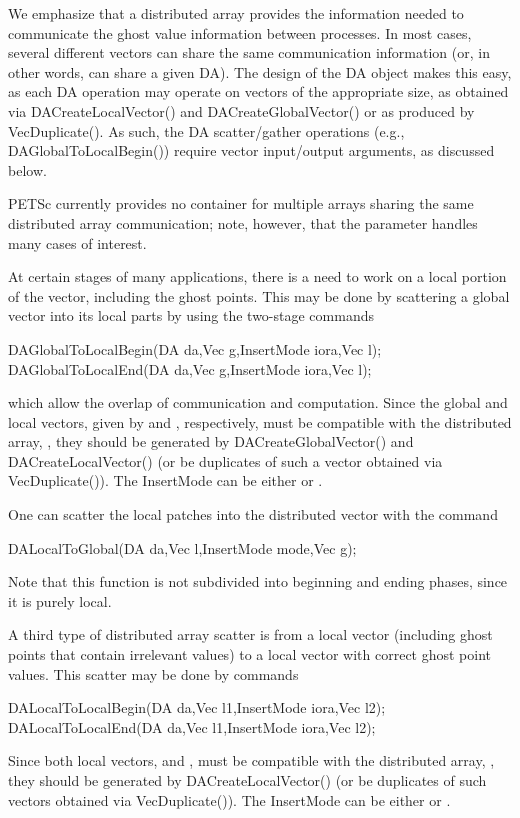 We emphasize that a distributed array provides the information needed
to communicate the ghost value information between processes.  In most
cases, several different vectors can share the same communication
information (or, in other words, can share a given DA).  The
design of the DA object makes this easy, as each DA
operation may operate on vectors of the appropriate size, as obtained
via DACreateLocalVector() and DACreateGlobalVector() or as
produced by VecDuplicate().  As such, the DA
scatter/gather operations (e.g., DAGlobalToLocalBegin()) require
vector input/output arguments, as discussed below.

PETSc currently provides no container for multiple arrays sharing the
same distributed array communication; note, however, that the 
parameter handles many cases of interest.

At certain stages of many applications, there is a need to work 
on a local portion of the vector, including the ghost points. 
This may be done by scattering a global vector into its 
local parts by using the two-stage commands
\begin{tabbing}
  DAGlobalToLocalBegin(DA da,Vec g,InsertMode iora,Vec l);\\
  DAGlobalToLocalEnd(DA da,Vec g,InsertMode iora,Vec l);
\end{tabbing}
which allow the overlap of communication and computation.
  
Since the global and local vectors, given by  and , respectively,
must be compatible with the distributed array, , they should be
generated by DACreateGlobalVector() 
 and DACreateLocalVector()
(or be duplicates of such a vector obtained via VecDuplicate()).
The InsertMode can be either  or .

One can scatter the local patches into the distributed vector
with the command 
\begin{tabbing}
  DALocalToGlobal(DA da,Vec l,InsertMode mode,Vec g);
\end{tabbing}
Note that this function is not
subdivided into beginning and ending phases, since it is purely local.

A third type of distributed array scatter is from a local
vector (including ghost points that contain irrelevant values) to 
a local vector with correct ghost point values. 
This scatter may be done by 
commands 
\begin{tabbing}
  DALocalToLocalBegin(DA da,Vec l1,InsertMode iora,Vec l2);\\
  DALocalToLocalEnd(DA da,Vec l1,InsertMode iora,Vec l2);
\end{tabbing}
Since both local vectors,  and ,
must be compatible with the distributed array, , they should be
generated by DACreateLocalVector() 
(or be duplicates of such vectors obtained via VecDuplicate()).
The InsertMode can be either  or .

